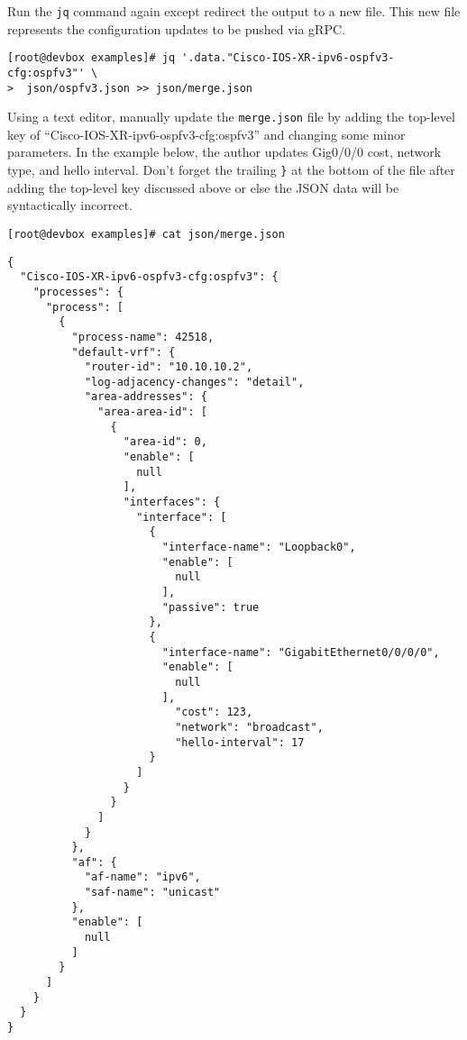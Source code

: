 Run the \verb|jq| command again except redirect the output to a new file. This new
file represents the configuration updates to be pushed via gRPC\@.

\begin{verbatim}
[root@devbox examples]# jq '.data."Cisco-IOS-XR-ipv6-ospfv3-cfg:ospfv3"' \
>  json/ospfv3.json >> json/merge.json
\end{verbatim}

Using a text editor, manually update the \verb|merge.json| file by adding the
top-level key of ``Cisco-IOS-XR-ipv6-ospfv3-cfg:ospfv3'' and changing some
minor parameters. In the example below, the author updates Gig0/0/0 cost,
network type, and hello interval. Don't forget the trailing \verb|}| at
the bottom of the file after adding the top-level key discussed above or else
the JSON data will be syntactically incorrect.

\begin{verbatim}
[root@devbox examples]# cat json/merge.json 
\end{verbatim}
\begin{verbatim}
{
  "Cisco-IOS-XR-ipv6-ospfv3-cfg:ospfv3": {
    "processes": {
      "process": [
        {
          "process-name": 42518,
          "default-vrf": {
            "router-id": "10.10.10.2",
            "log-adjacency-changes": "detail",
            "area-addresses": {
              "area-area-id": [
                {
                  "area-id": 0,
                  "enable": [
                    null
                  ],
                  "interfaces": {
                    "interface": [
                      {
                        "interface-name": "Loopback0",
                        "enable": [
                          null
                        ],
                        "passive": true
                      },
                      {
                        "interface-name": "GigabitEthernet0/0/0/0",
                        "enable": [
                          null
                        ],
                          "cost": 123,
                          "network": "broadcast",
                          "hello-interval": 17
                      }
                    ]
                  }
                }
              ]
            }
          },
          "af": {
            "af-name": "ipv6",
            "saf-name": "unicast"
          },
          "enable": [
            null
          ]
        }
      ]
    }
  }
}
\end{verbatim}

